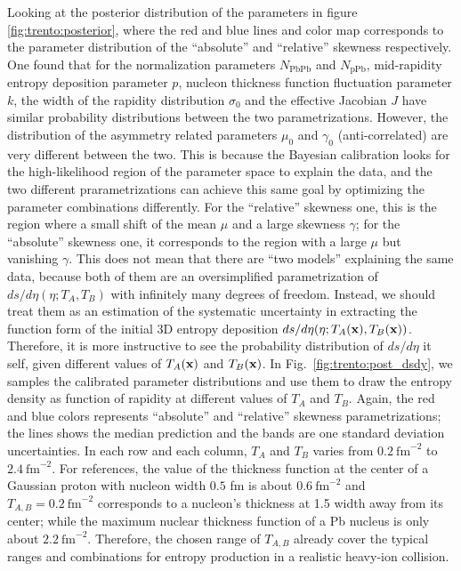 Looking at the posterior distribution of the parameters in figure \ref{fig:trento:posterior}, where the red and blue lines and color map corresponds to the parameter distribution of the ``absolute'' and ``relative'' skewness respectively.
One found that for the normalization parameters $N_{\textrm{PbPb}}$ and $N_{\textrm{pPb}}$, mid-rapidity entropy deposition parameter $p$, nucleon thickness function fluctuation parameter $k$, the width of the rapidity distribution $\sigma_0$ and the effective Jacobian $J$ have similar probability distributions between the two parametrizations.
However, the distribution of the asymmetry related parameters $\mu_0$ and $\gamma_0$ (anti-correlated) are very different between the two.
This is because the Bayesian calibration looks for the high-likelihood region of the parameter space to explain the data, and the two different prarametrizations can achieve this same goal by optimizing the parameter combinations differently.
For the ``relative'' skewness one, this is the region where a small shift of the mean $\mu$ and a large skewness $\gamma$; for the ``absolute'' skewness one, it corresponds to the region with a large $\mu$ but vanishing $\gamma$.
This does not mean that there are ``two models'' explaining the same data, because both of them are an oversimplified parametrization of $ds/d\eta(\eta; T_A, T_B)$ with infinitely many degrees of freedom. 
Instead, we should treat them as an estimation of the systematic uncertainty in extracting the function form of the initial 3D entropy deposition $ds/d\eta(\eta; T_A(\mathbf x), T_B(\mathbf x))$.
Therefore, it is more instructive to see the probability distribution of $ds/d\eta$ it self, given different values of $T_A(\mathbf x)$ and $T_B(\mathbf x)$.
In Fig.~\ref{fig:trento:post_dsdy}, we samples the calibrated parameter distributions and use them to draw the entropy density as function of rapidity at different values of $T_A$ and $T_B$. 
Again, the red and blue colors represents ``absolute'' and ``relative'' skewness parametrizations; the lines shows the median prediction and the bands are one standard deviation uncertainties. 
In each row and each column, $T_A$ and $T_B$ varies from $0.2~\text{fm}^{-2}$ to $2.4~\text{fm}^{-2}$. 
For references, the value of the thickness function at the center of a Gaussian proton with nucleon width $0.5$ fm is about $0.6~\text{fm}^{-2}$ and $T_{A,B} = 0.2~\text{fm}^{-2}$ corresponds to a nucleon's thickness at  1.5 width away from its center; while the maximum nuclear thickness function of a Pb nucleus is only about $2.2~\text{fm}^{-2}$.
Therefore, the chosen range of $T_{A,B}$ already cover the typical ranges and combinations for entropy production in a realistic heavy-ion collision.

